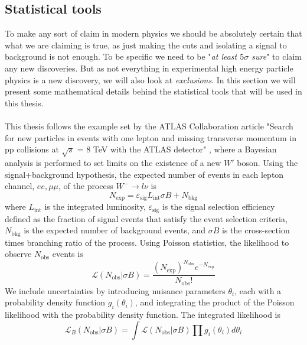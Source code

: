 \documentclass[12pt, a4paper]{book}
\begin{document}
\subsection{Statistical tools}\label{sec:stat_anal}
To make any sort of claim in modern physics we should be absolutely certain that what we are claiming is true, as just making the cuts and isolating a signal to background is not enough. To be specific we need to be "\textit{at least $5\sigma$ sure}" to claim any new discoveries. 
But as not everything in experimental high energy particle physics is a new discovery, we will also look at \textit{exclusions}. In this section we will present some mathematical details behind the statistical tools that will be used in this thesis.\\ 
\\This{} thesis follows the example set by the ATLAS Collaboration article "Search for new particles in events with one lepton and missing transverse momentum in pp collisions at $\sqrt s$ = 8 TeV with the ATLAS detector" \cite{Stat},
where a Bayesian analysis is performed to set limits on the existence of a new $W'$ boson. Using the signal+background hypothesis, the expected number of events in each lepton channel, $ee, \mu\mu$, of the process $W^-\rightarrow l\nu$ is 
$$
    N_{\text{exp}} = \varepsilon_{\text{sig}}L_{\text{int}}\sigma B + N_{\text{bkg}}
$$
where $L_{\text{int}}$ is the integrated luminosity, $\varepsilon_{\text{sig}}$ is the signal selection efficiency defined as the fraction of signal events that satisfy the event selection criteria, $N_{\text{bkg}}$ is the expected number of background events, and $\sigma B$ is the 
cross-section times branching ratio of the process. Using Poisson statistics, the likelihood to observe $N_{\text{obs}}$ events is
\begin{equation}\label{eq:observed_events_prob}
    \mathcal{L}(N_{\text{obs}}\vert \sigma B) = \frac{(N_{\text{exp}})^{N_{\text{obs}}}e^{-N_{\text{exp}}}}{N_{\text{obs}}!}
\end{equation}
We include uncertainties by introducing nuisance parameters $\theta_i$, each with a probability density function $g_i(\theta_i)$, and integrating the product of the Poisson likelihood with the probability density function. The integrated likelihood is
\begin{equation}\label{eq:observed_events_nuisance}
    \mathcal{L}_B(N_{\text{obs}}\vert \sigma B)=\int\mathcal{L}(N_{\text{obs}}\vert \sigma B)\prod g_i(\theta_i)d\theta_i
\end{equation}
\end{document}
